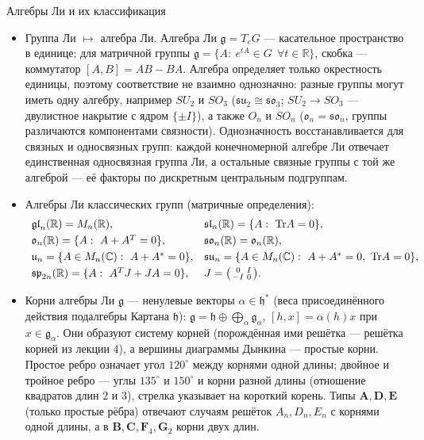 \documentclass[serif, aspectratio=169]{beamer}
\begin{document}
\begin{frame}{Алгебры Ли и их классификация}
{\begin{itemize}
            \item Группа Ли $\mapsto$ алгебра Ли. Алгебра Ли $\mathfrak{g}=T_eG$ --- касательное пространство в единице; для матричной группы $\mathfrak{g}=\{A:\ e^{tA}\in G\ \ \forall t\in\mathbb{R}\}$, скобка --- коммутатор $[A,B]=AB-BA$. Алгебра определяет только окрестность единицы, поэтому соответствие не взаимно однозначно: разные группы могут иметь одну алгебру, например $SU_2$ и $SO_3$ ($\mathfrak{su}_2\cong\mathfrak{so}_3$; $SU_2\to SO_3$ --- двулистное накрытие с ядром $\{\pm I\}$), а также $O_n$ и $SO_n$ ($\mathfrak{o}_n=\mathfrak{so}_n$, группы различаются компонентами связности). Однозначность восстанавливается для связных и односвязных групп: каждой конечномерной алгебре Ли отвечает единственная односвязная группа Ли, а остальные связные группы с той же алгеброй --- её факторы по дискретным центральным подгруппам.
            \item Алгебры Ли классических групп (матричные определения):
            \[
            \begin{array}{ll}
                \mathfrak{gl}_n(\mathbb{R}) = M_n(\mathbb{R}), & \mathfrak{sl}_n(\mathbb{R}) = \{A:\ \mathrm{Tr}A=0\}, \\[0.7ex]
                \mathfrak{o}_n(\mathbb{R}) = \{A:\ A+A^T=0\}, & \mathfrak{so}_n(\mathbb{R}) = \mathfrak{o}_n(\mathbb{R}), \\[0.7ex]
                \mathfrak{u}_n = \{A\in M_n(\mathbb{C}):\ A+A^*=0\}, & \mathfrak{su}_n = \{A\in M_n(\mathbb{C}):\ A+A^*=0,\ \mathrm{Tr}A=0\}, \\[0.7ex]
                \mathfrak{sp}_{2n}(\mathbb{R}) = \{A:\ A^TJ+JA=0\}, & J=\begin{psmallmatrix}0&I\\-I&0\end{psmallmatrix}.
            \end{array}
            \]
            \item Корни алгебры Ли $\mathfrak{g}$ --- ненулевые векторы $\alpha\in\mathfrak{h}^*$ (веса присоединённого действия подалгебры Картана $\mathfrak{h}$): $\mathfrak{g}=\mathfrak{h}\oplus\bigoplus_\alpha\mathfrak{g}_\alpha$, $[h,x]=\alpha(h)x$ при $x\in\mathfrak{g}_\alpha$. Они образуют систему корней (порождённая ими решётка — решётка корней из лекции 4), а вершины диаграммы Дынкина --- простые корни. Простое ребро означает угол $120^\circ$ между корнями одной длины; двойное и тройное ребро --- углы $135^\circ$ и $150^\circ$ и корни разной длины (отношение квадратов длин $2$ и $3$), стрелка указывает на короткий корень. Типы $\mathbf{A},\mathbf{D},\mathbf{E}$ (только простые рёбра) отвечают случаям решёток $A_n,D_n,E_n$ с корнями одной длины, а в $\mathbf{B},\mathbf{C},\mathbf{F}_4,\mathbf{G}_2$ корни двух длин.
        \end{itemize}
    }
\end{frame}
\end{document}
